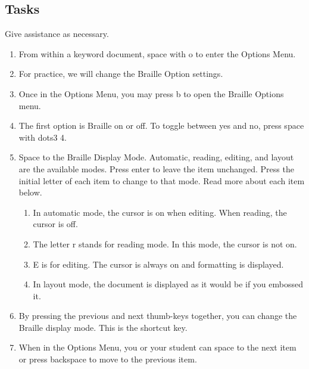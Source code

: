 \documentclass[10pt,letterpaper,twoside]{report}
\begin{document}
{{{{ \subsection{Tasks}



Give assistance as necessary.



\begin{enumerate}
	\item From within a keyword document, space with o to enter the Options Menu.
	      
	\item For practice, we will change the Braille Option settings.
	      
	\item Once in the Options Menu, you may press b to open the Braille Options menu.
	      
	\item The first option is Braille on or off.  To toggle between yes and no, press space with dots3 4.
	      
	\item Space to the Braille Display Mode.  Automatic, reading, editing, and layout are the available modes.  Press enter to leave the item unchanged. Press the initial letter of each item to change to that mode.  Read more about each item below.
	      
	      \begin{enumerate}
		      \item In automatic mode, the cursor is on when editing.  When reading, the cursor is off.
		            
		      \item The letter r stands for reading mode.  In this mode, the cursor is not on.
		            
		      \item E is for editing.  The cursor is always on and formatting is displayed.
		            
		      \item In layout mode, the document is displayed as it would be if you embossed it.
		            
		            
	      \end{enumerate}
	\item By pressing the previous and next thumb-keys together, you can change the Braille display mode.  This is the shortcut key.
	      
	\item When in the Options Menu, you or your student can space to the next item or press backspace to move to the previous item.
	      

\end{enumerate}}}}}
\end{document}
